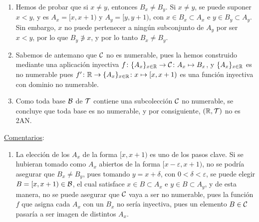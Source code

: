 \begin{ej}
\begin{enumerate}[topsep=5pt,itemsep=0pt]
        \item Hemos de probar que si $x \neq y$, entonces $B_x \neq B_y$. Si $x \neq y$, se puede suponer $x < y$, y es $A_x = [x,x + 1)$ y $A_y = [y,y + 1)$, con $x\in B_x \subset A_x$ e $y\in B_y \subset A_y$. Sin embargo, $x$ no puede pertenecer a ningún subconjunto de $A_y$ por ser $x < y$, por lo que $B_y \not\ni x$, y por lo tanto $B_x \neq B_y$. 
        \item Sabemos de antemano que $\mathcal{C}$ no es numerable, pues la hemos construido mediante una aplicación inyectiva $f\colon \{A_x\}_{x\in \mathbb{R}} \to \mathcal{C}\colon A_x \mapsto B_x$, y $\{A_x\}_{x\in \mathbb{R}}$ es no numerable pues $f'\colon \mathbb{R} \to \{A_x\}_{x\in \mathbb{R}} \colon x \mapsto [x,x+1)$ es una función inyectiva con dominio no numerable.
        \item Como toda base $\mathcal{B}$ de $\mathcal{T}$ contiene una subcolección $\mathcal{C}$ no numerable, se concluye que toda base es no numerable, y por consiguiente, $(\mathbb{R}, \mathcal{T})$ no es 2AN.
    \end{enumerate}

    \underline{Comentarios}: 
    \begin{enumerate}[topsep=5pt,label=--]
        \item La elección de los $A_x$ de la forma $[x,x+1)$ es uno de los pasos clave. Si se hubieran tomado como $A_x$ abiertos de la forma $[x-\varepsilon, x + 1)$, no se podría asegurar que $B_x \neq B_y$, pues tomando $y = x + \delta$, con $0 < \delta < \varepsilon$, %
        se puede elegir $B = [x, x+1) \in\mathcal{B}$, el cual satisface $x\in B \subset A_x$ e $y\in B \subset A_y$, y de esta manera, no se puede asegurar que $\mathcal{C}$ vaya a ser no numerable, pues la función $f$ que asigna cada $A_x$ con un $B_x$ no sería inyectiva, pues un elemento $B\in\mathcal{C}$ pasaría a ser imagen de distintos $A_x$.
        \begin{center}
\end{center}
\end{enumerate}
\end{ej}
